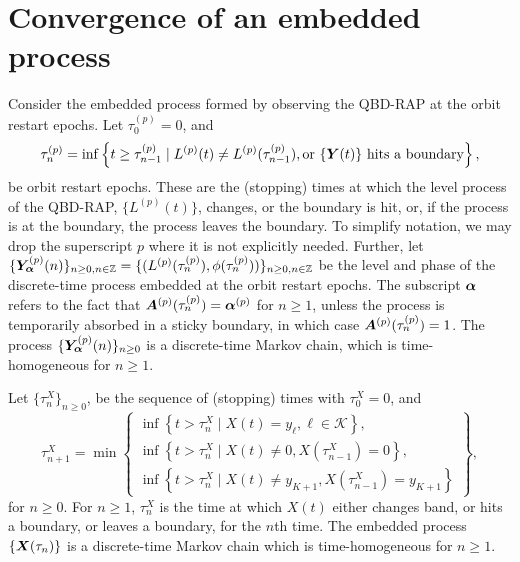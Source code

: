 
\section{Convergence of an embedded process}\label{sec: embedded}


Consider the embedded process formed by observing the QBD-RAP at the orbit restart epochs. Let \(\tau_0^{(p)}=0\), and
\[\tau_{n}^{(p)} = \inf\left\{t\geq \tau_{n-1}^{(p)} \mid L^{(p)}(t)\neq L^{(p)}(\tau_{n-1}^{(p)}), \mbox{or \(\{\boldsymbol Y(t)\}\) hits a boundary}\right\},\]
be orbit restart epochs. These are the (stopping) times at which the level process of the QBD-RAP, \(\{L^{(p)}(t)\}\), changes, or the boundary is hit, or, if the process is at the boundary, the process leaves the boundary. To simplify notation, we may drop the superscript \(p\) where it is not explicitly needed. Further, let \(\{\bm{Y}_{\bm{\alpha}}^{(p)}(n)\}_{n\geq 0, n \in \mathbb Z} = \{(L^{(p)}(\tau_n^{(p)}),\phi(\tau_n^{(p)}))\}_{n\geq 0, n \in \mathbb Z}\) be the level and phase of the discrete-time process embedded at the orbit restart epochs. The subscript \(\boldsymbol \alpha \) refers to the fact that \(\boldsymbol A^{(p)}(\tau_n^{(p)})=\boldsymbol \alpha^{(p)}\) for \(n\geq 1\), unless the process is temporarily absorbed in a sticky boundary, in which case \(\boldsymbol A^{(p)}(\tau_n^{(p)})=1\). The process \(\{\bm{Y}_{\bm{\alpha}}^{(p)}(n)\}_{n\geq 0}\) is a discrete-time Markov chain, which is time-homogeneous for \(n\geq 1\). 

Let \(\{\tau_n^X\}_{n\geq 0}\), be the sequence of (stopping) times with \(\tau_0^X=0\), and 
\[\tau_{n+1}^X = \min\left\{\begin{array}{c}\inf\left\{t>\tau_n^X\mid X(t)=y_{\ell}, \ell\in\mathcal K\right\}, \\ \inf\left\{t>\tau_n^X \mid X(t) \neq 0, X(\tau_{n-1}^X)=0\right\}, \\ \inf\left\{t>\tau_n^X \mid X(t) \neq y_{K+1}, X(\tau_{n-1}^X)=y_{K+1}\right\} \end{array} \right\},\]
for \(n\geq 0\). For \(n\geq 1\), \(\tau_n^X\) is the time at which \(X(t)\) either changes band, or hits a boundary, or leaves a boundary, for the \(n\)th time. The embedded process \(\{\boldsymbol X(\tau_n)\}\) is a discrete-time Markov chain which is time-homogeneous for \(n\geq 1\). 

